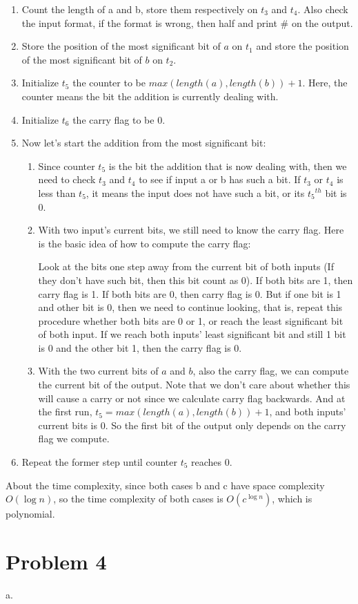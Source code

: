 \documentclass[12pt]{article}
\begin{document}
\begin{enumerate}
\item Count the length of a and b, store them respectively on $t_3$ and
  $t_4$. Also check the input format, if the format is wrong, then half
  and print \# on the output. 
\item Store the position of the most significant bit of $a$ on $t_1$
  and store the position of the most significant bit of $b$ on
  $t_2$.
\item Initialize $t_5$ the counter to be $max(length(a),
  length(b)) + 1$. Here, the counter means the bit the addition is
  currently dealing with. 
\item Initialize $t_6$ the carry flag to be $0$.
\item Now let's start the addition from the most significant bit:
  \begin{enumerate}
  \item Since counter $t_5$ is the bit the addition that is now
    dealing with, then we need to check $t_3$ and $t_4$ to see if
    input a or b has such a bit. If $t_3$ or $t_4$ is less than $t_5$,
    it means the input does not have such a bit, or its ${t_5}^{th}$
    bit is $0$.
  \item With two input's current bits, we still need to know the carry
    flag. Here is the basic idea of how to compute the carry flag:
    
    Look at the bits one step away from the current bit of both inputs
    (If they don't have such bit, then this bit count as 0). If both
    bits are 1, then carry flag is 1. If both bits are 0, then carry
    flag is 0. But if one bit is 1 and other bit is 0, then we need to
    continue looking, that is, repeat this procedure whether both bits
    are 0 or 1, or reach the least significant bit of both input. If
    we reach both inputs' least significant bit and still 1 bit is 0
    and the other bit 1, then the carry flag is 0.
  \item With the two current bits of $a$ and $b$, also the carry flag,
    we can compute the current bit of the output. Note that we don't
    care about whether this will cause a carry or not since we
    calculate carry flag backwards. And at the first run, $t_5 =
    max(length(a), length(b)) + 1$, and both inputs' current bits is
    0. So the first bit of the output only depends on the carry flag
    we compute. 
  \end{enumerate}
\item Repeat the former step until counter $t_5$ reaches 0.
\end{enumerate}

About the time complexity, since both cases b and c have space
complexity $O(\log n)$, so the time complexity of both cases is
$O(c^{\log n})$, which is polynomial.

\section*{Problem 4}

a.
\end{document}
